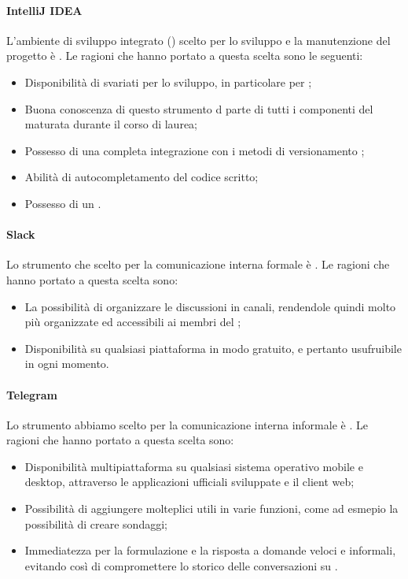 \paragraph{IntelliJ IDEA}
L'ambiente di sviluppo integrato () scelto per lo sviluppo e la manutenzione del progetto è . Le ragioni che hanno portato a questa scelta sono le seguenti:
\begin{itemize}
\item Disponibilità di svariati  per lo sviluppo, in particolare per ;
\item Buona conoscenza di questo strumento d parte di tutti i componenti del  maturata durante il corso di laurea;
\item Possesso di una completa integrazione con i metodi di versionamento ;
\item Abilità di autocompletamento del codice  scritto;
\item Possesso di un  .
\end{itemize}

\paragraph{Slack}
Lo strumento che scelto per la comunicazione interna formale è .
Le ragioni che hanno portato a questa scelta sono:
\begin{itemize}
\item La possibilità di organizzare le discussioni in canali, rendendole quindi molto più organizzate ed accessibili ai membri del ;
\item Disponibilità su qualsiasi piattaforma in modo gratuito, e pertanto usufruibile in ogni momento.
\end{itemize}

\paragraph{Telegram}
Lo strumento abbiamo scelto per la comunicazione interna informale è .
Le ragioni che hanno portato a questa scelta sono:
\begin{itemize}
\item Disponibilità multipiattaforma su qualsiasi sistema operativo mobile e desktop, attraverso le applicazioni ufficiali sviluppate e il client web;
\item Possibilità di aggiungere molteplici  utili in varie funzioni, come ad esmepio la possibilità di creare sondaggi;
\item Immediatezza per la formulazione e la risposta a domande veloci e informali, evitando così di compromettere lo storico delle conversazioni su .
\end{itemize}

